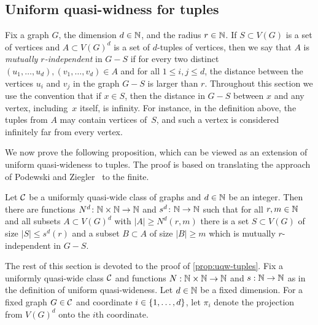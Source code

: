\subsection{Uniform quasi-widness for tuples}\label{sec:uqw-tuples}
Fix a graph $G$, the dimension $d\in\N$, and the radius $r\in \N$.
If $S\subset V(G)$ is a set of vertices and $A\subset V(G)^d$ is a set of $d$-tuples of vertices,
then we say that $A$ is \emph{mutually $r$-independent} in $G-S$ 
if for every two distinct $(u_1,\ldots,u_d),(v_1,\ldots,v_d)\in A$
and for all $1\le i,j\le d$, the distance between the vertices $u_i$ and $v_j$ in the graph $G-S$
is larger than $r$. Throughout this section we use the convention that if $x\in S$, then the distance in $G-S$ between $x$ and any vertex, including~$x$ itself, is infinity. 
For instance, in the definition above, the tuples from $A$ may contain vertices of~$S$, and such a vertex is considered infinitely far from every vertex.

We now prove the following proposition, which can be viewed as an extension of uniform quasi-wideness to tuples.
The proof is based on translating the approach of Podewski and Ziegler~\cite{podewski1978stable} to the finite.

\begin{proposition}\label{prop:uqw-tuples}
	Let $\cal C$ be a uniformly quasi-wide class of graphs and $d\in\N$ be an integer.
	Then there are functions $N^d\colon \N\times\N\to\N$ and $s^d\colon \N\to\N$
	such that for all $r,m\in\N$ and all subsets $A\subset V(G)^d$
	with $|A|\ge N^d(r,m)$ there  is a set $S\subset V(G)$
	of size $|S|\le s^d(r)$ and a subset $B\subset A$ of size $|B|\ge m$ which is mutually $r$-independent in $G-S$.
\end{proposition}

The rest of this section is devoted to the proof of \cref{prop:uqw-tuples}.
Fix a uniformly quasi-wide class $\cal C$ and functions $N:\N\times\N\to \N$
	and $s:\N\to\N$ as in the definition of uniform quasi-wideness.
	Let $d\in \N$ be a fixed dimension.
		For a fixed graph $G\in \cal C$  and
	  coordinate $i\in\set{1,\ldots,d}$, let $\pi_i$ denote the projection from $V(G)^d$ onto the $i$th coordinate.

	


